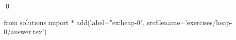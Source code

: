 
\begin{ex} 
  \label{ex:heap-0}
  
  \qed
\end{ex} 
\begin{python0}
from solutions import *
add(label="ex:heap-0",
    srcfilename='exercises/heap-0/answer.tex') 
\end{python0}
